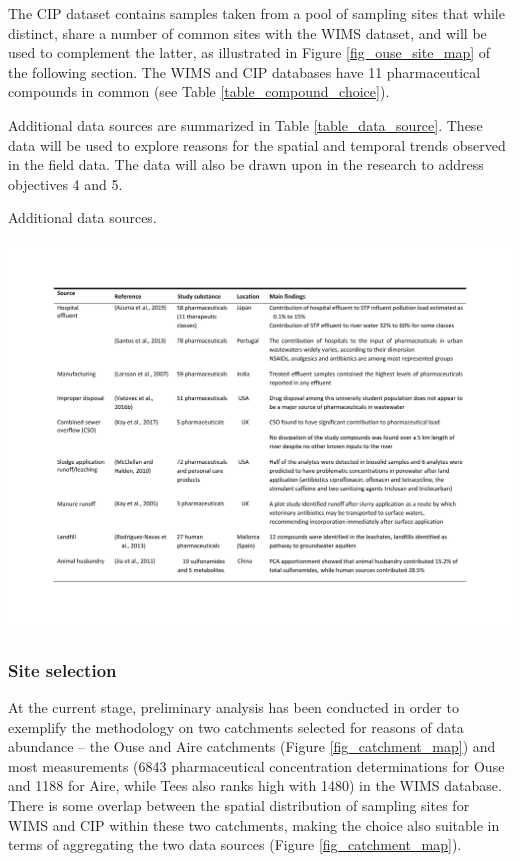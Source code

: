 \documentclass{article}
\begin{document}
The CIP dataset contains samples taken from a pool of sampling sites that while distinct, share a number of common sites with the WIMS dataset, and will be used to complement the latter, as illustrated in Figure \ref{fig_ouse_site_map} of the following section. The WIMS and CIP databases have 11 pharmaceutical compounds in common (see Table \ref{table_compound_choice}). 

Additional data sources are summarized in  Table \ref{table_data_source}. These data will be used to explore reasons for the spatial and temporal trends observed in the field data. The data will also be drawn upon in the research to address objectives 4 and 5.

\begin{table}[!h]
    \caption{Additional data sources.}
    \includegraphics[page=4,width=\linewidth,trim=2cm 8cm 1cm 2cm, clip]{just tables.pdf}
    \label{table_data_source}
\end{table}
\nocite{Mavragani2016QuantifyingAntibiotics}

\subsubsection{Site selection}

At the current stage, preliminary analysis has been conducted in order to exemplify the methodology on two catchments selected for reasons of data abundance – the Ouse and Aire catchments (Figure \ref{fig_catchment_map}) and most measurements (6843 pharmaceutical concentration determinations for Ouse and 1188 for Aire, while Tees also ranks high with 1480) in the WIMS database. There is some overlap between the spatial distribution of sampling sites for WIMS and CIP within these two catchments, making the choice also suitable in terms of aggregating the two data sources (Figure \ref{fig_catchment_map}).
\end{document}
